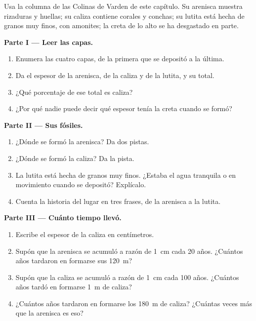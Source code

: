 \begin{problem}
\label{pb:g7:sediments-and-fossils:1}
Usa la columna de las Colinas de Varden de este capítulo. Su arenisca
muestra rizaduras y huellas; su caliza contiene corales y conchas; su
lutita está hecha de granos muy finos, con amonites; la creta de lo alto
se ha desgastado en parte.

\medskip
\noindent\textbf{Parte I --- Leer las capas.}\par\nopagebreak
\begin{enumerate}[beginpenalty=10000]
  \item Enumera las cuatro capas, de la primera que se depositó a la
        última.
  \item Da el espesor de la arenisca, de la caliza y de la lutita, y su
        total.
  \item ¿Qué porcentaje de ese total es caliza?
  \item ¿Por qué nadie puede decir qué espesor tenía la creta cuando se
        formó?
\end{enumerate}

\medskip
\noindent\textbf{Parte II --- Sus fósiles.}\par\nopagebreak
\begin{enumerate}[resume, beginpenalty=10000]
  \item ¿Dónde se formó la arenisca? Da dos pistas.
  \item ¿Dónde se formó la caliza? Da la pista.
  \item La lutita está hecha de granos muy finos. ¿Estaba el agua tranquila
        o en movimiento cuando se depositó? Explícalo.
  \item Cuenta la historia del lugar en tres frases, de la arenisca a la
        lutita.
\end{enumerate}

\medskip
\noindent\textbf{Parte III --- Cuánto tiempo llevó.}\par\nopagebreak
\begin{enumerate}[resume, beginpenalty=10000]
  \item Escribe el espesor de la caliza en centímetros.
  \item Supón que la arenisca se acumuló a razón de \qty{1}{cm} cada
        20 años. ¿Cuántos años tardaron en formarse sus \qty{120}{m}?
  \item Supón que la caliza se acumuló a razón de \qty{1}{cm} cada
        100 años. ¿Cuántos años tardó en formarse \qty{1}{m} de caliza?
  \item ¿Cuántos años tardaron en formarse los \qty{180}{m} de caliza?
        ¿Cuántas veces más que la arenisca es eso?
\end{enumerate}
\end{problem}
